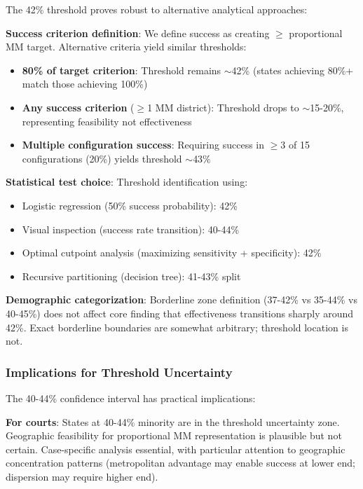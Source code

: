The 42\% threshold proves robust to alternative analytical approaches:

\textbf{Success criterion definition}: We define success as creating $\geq$ proportional MM target. Alternative criteria yield similar thresholds:
\begin{itemize}
    \item \textbf{80\% of target criterion}: Threshold remains $\sim$42\% (states achieving 80\%+ match those achieving 100\%)
    \item \textbf{Any success criterion} ($\geq$1 MM district): Threshold drops to $\sim$15-20\%, representing feasibility not effectiveness
    \item \textbf{Multiple configuration success}: Requiring success in $\geq$3 of 15 configurations (20\%) yields threshold $\sim$43\%
\end{itemize}

\textbf{Statistical test choice}: Threshold identification using:
\begin{itemize}
    \item Logistic regression (50\% success probability): 42\%
    \item Visual inspection (success rate transition): 40-44\%
    \item Optimal cutpoint analysis (maximizing sensitivity + specificity): 42\%
    \item Recursive partitioning (decision tree): 41-43\% split
\end{itemize}

\textbf{Demographic categorization}: Borderline zone definition (37-42\% vs 35-44\% vs 40-45\%) does not affect core finding that effectiveness transitions sharply around 42\%. Exact borderline boundaries are somewhat arbitrary; threshold location is not.

\subsubsection{Implications for Threshold Uncertainty}

The 40-44\% confidence interval has practical implications:

\textbf{For courts}: States at 40-44\% minority are in the threshold uncertainty zone. Geographic feasibility for proportional MM representation is plausible but not certain. Case-specific analysis essential, with particular attention to geographic concentration patterns (metropolitan advantage may enable success at lower end; dispersion may require higher end).

